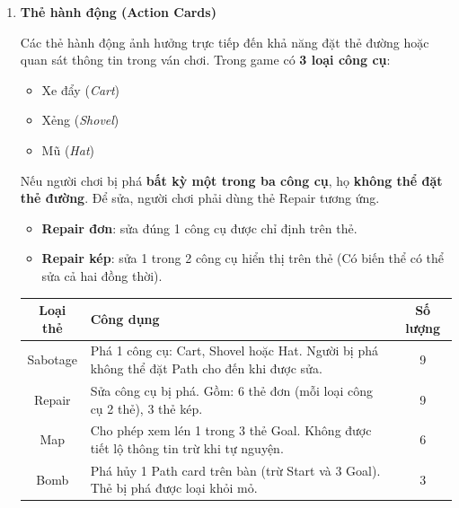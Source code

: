 \begin{enumerate}
\begin{itemize}
  \item \textbf{Phá đường bằng thẻ Bomb}  
  Thẻ \emph{Bomb} là thẻ hành động dùng để phá hủy một thẻ Đường đã được đặt trên bàn.
  \begin{itemize}
    \item Người chơi chọn một thẻ Đường bất kỳ (trừ thẻ Start và thẻ Goal) để loại bỏ.
    \item Sau khi phá, ô trống được để lại và không có thẻ nào tự động dịch chuyển vào.
    \item Bomb không được dùng để phá thẻ trên tay người chơi, chỉ phá thẻ đã đặt.
  \end{itemize}

\end{itemize}
\item \textbf{Thẻ hành động (Action Cards)} 

Các thẻ hành động ảnh hưởng trực tiếp đến khả năng đặt thẻ đường hoặc quan sát thông tin trong ván chơi.  
Trong game có \textbf{3 loại công cụ}: 
\begin{itemize}
    \item Xe đẩy (\textit{Cart})
    \item Xẻng (\textit{Shovel})
    \item Mũ (\textit{Hat})
\end{itemize}

Nếu người chơi bị phá \textbf{bất kỳ một trong ba công cụ}, họ \textbf{không thể đặt thẻ đường}.  
Để sửa, người chơi phải dùng thẻ Repair tương ứng.

\begin{itemize}
    \item \textbf{Repair đơn}: sửa đúng 1 công cụ được chỉ định trên thẻ.
    \item \textbf{Repair kép}: sửa 1 trong 2 công cụ hiển thị trên thẻ (Có biến thể có thể sửa cả hai đồng thời).
\end{itemize}

\begin{table}[H]
\centering
\begin{tabular}{|c|p{7cm}|c|}
\hline
\textbf{Loại thẻ} & \textbf{Công dụng} & \textbf{Số lượng} \\ \hline
Sabotage & Phá 1 công cụ: Cart, Shovel hoặc Hat. Người bị phá không thể đặt Path cho đến khi được sửa. & 9 \\ \hline
Repair   & Sửa công cụ bị phá. Gồm: 6 thẻ đơn (mỗi loại công cụ 2 thẻ), 3 thẻ kép. & 9 \\ \hline
Map      & Cho phép xem lén 1 trong 3 thẻ Goal. Không được tiết lộ thông tin trừ khi tự nguyện. & 6 \\ \hline
Bomb & Phá hủy 1 Path card trên bàn (trừ Start và 3 Goal). Thẻ bị phá được loại khỏi mỏ. & 3 \\ \hline
\end{tabular}
\end{table}


\end{enumerate}